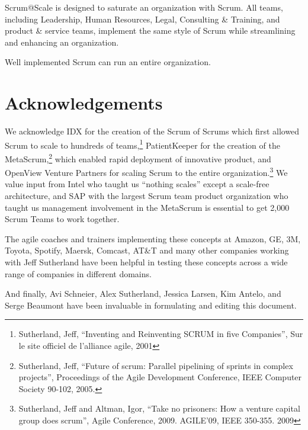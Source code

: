 \documentclass[12pt,a4paper,parskip=full]{scrartcl}
\begin{document}
Scrum@Scale is designed to saturate an organization with Scrum. All teams, including Leadership, Human Resources, Legal, Consulting \& Training, and product \& service teams, implement the same style of Scrum while streamlining and enhancing an organization.

Well implemented Scrum can run an entire organization.

\section{Acknowledgements}

We acknowledge IDX for the creation of the Scrum of Scrums which first allowed Scrum to scale to hundreds of teams,\footnote{Sutherland, Jeff, ``Inventing and Reinventing SCRUM in five Companies'', Sur le site officiel de l'alliance agile, 2001} PatientKeeper for the creation of the MetaScrum,\footnote{Sutherland, Jeff, ``Future of scrum: Parallel pipelining of sprints in complex projects'', Proceedings of the Agile Development Conference,  IEEE Computer Society 90-102,  2005.} which enabled rapid deployment of innovative product, and OpenView Venture Partners for scaling Scrum to the entire organization.\footnote{Sutherland, Jeff and Altman, Igor, ``Take no prisoners: How a venture capital group does scrum'', Agile Conference, 2009. AGILE'09, IEEE 350-355.  2009} We value input from Intel who taught us ``nothing scales'' except a scale-free architecture, and SAP with the largest Scrum team product organization who taught us management involvement in the MetaScrum is essential to get 2,000 Scrum Teams to work together.

The agile coaches and trainers implementing these concepts at Amazon, GE, 3M, Toyota, Spotify, Maersk, Comcast, AT\&T and many other companies working with Jeff Sutherland have been helpful in testing these concepts across a wide range of companies in different domains.

And finally, Avi Schneier, Alex Sutherland, Jessica Larsen, Kim Antelo, and Serge Beaumont have been invaluable in formulating and editing this document.

\pagebreak

\printbibliography
\end{document}
